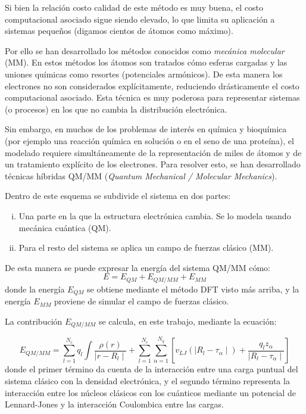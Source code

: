 Si bien la relaci\'on costo calidad de este m\'etodo es muy buena, el costo computacional asociado sigue siendo elevado, lo que limita su aplicaci\'on a sistemas peque\~nos (digamos cientos de \'atomos como m\'aximo).

Por ello se han desarrollado los m\'etodos conocidos como \emph{mec\'anica molecular} (MM).
En estos m\'etodos los \'atomos son tratados c\'omo esferas cargadas y las uniones qu\'imicas como resortes (potenciales arm\'onicos).
De esta manera los electrones no son considerados expl\'icitamente, reduciendo dr\'asticamente el costo computacional asociado.
Esta t\'ecnica es muy poderosa para representar sistemas (o procesos) en los que no cambia la distribuci\'on electr\'onica.

Sin embargo, en muchos de los problemas de inter\'es en qu\'imica y bioqu\'imica (por ejemplo una reacci\'on qu\'imica en soluci\'on o en el seno de una prote\'ina), el modelado requiere simult\'aneamente de la representaci\'on de miles de \'atomos y de un tratamiento expl\'icito de los electrones.
Para resolver esto, se han desarrollado t\'ecnicas h\'ibridas QM/MM (\textit{Quantum Mechanical / Molecular Mechanics}).

Dentro de este esquema se subdivide el sistema en dos partes:
\begin{enumerate}[i)]
\item Una parte en la que la estructura electr\'onica cambia. Se lo modela usando mec\'anica cu\'antica (QM).

\item Para el resto del sistema se aplica un campo de fuerzas cl\'asico (MM).
\end{enumerate}

De esta manera se puede expresar la energ\'ia del sistema QM/MM c\'omo:
\begin{equation}
    E = E_{QM} + E_{QM/MM} + E_{MM}
\end{equation}
donde la energ\'ia $E_{QM}$ se obtiene mediante el m\'etodo DFT visto m\'as arriba, y la energ\'ia $E_{MM}$ proviene de simular el campo de fuerzas cl\'asico.

La contribuci\'on $E_{QM/MM}$ se calcula, en este trabajo, mediante la ecuaci\'on:

\begin{equation}
    E_{QM/MM} = \sum_{l = 1}^{N_c} q_l \int \frac{\rho(r)}{\mid r - R_l \mid} + \sum_{l = 1}^{N_c}\sum_{\alpha = 1}^{N_q} [ v_{LJ} ( \mid R_l - \tau_\alpha \mid ) + \frac{q_l z_\alpha}{\mid R_l - \tau_\alpha \mid} ]
\end{equation}
donde el primer t\'ermino da cuenta de la interacci\'on entre una carga puntual del sistema cl\'asico con la densidad electr\'onica, y el segundo t\'ermino representa la interacci\'on entre los n\'ucleos cl\'asicos con los cu\'anticos mediante un potencial de Lennard-Jones y la interacci\'on Coulombica entre las cargas.

